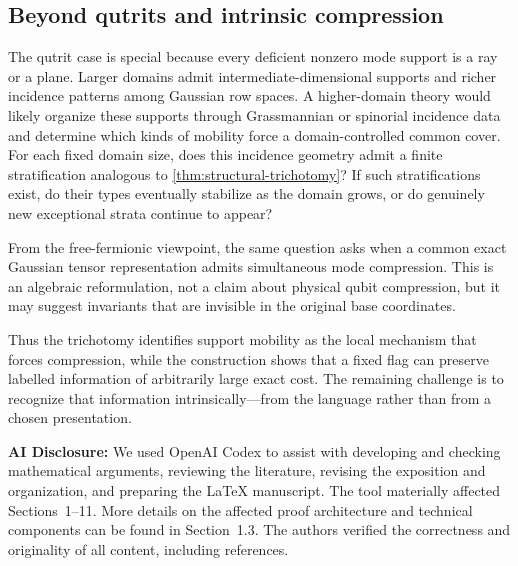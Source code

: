 \documentclass[11pt]{article}
\theoremstyle{definition}
\theoremstyle{remark}
\begin{document}
\subsection{Beyond qutrits and intrinsic compression}

The qutrit case is special because every deficient nonzero mode support is a
ray or a plane.  Larger domains admit intermediate-dimensional supports and
richer incidence patterns among Gaussian row spaces.  A higher-domain theory
would likely organize these supports through Grassmannian or spinorial
incidence data and determine which kinds of mobility force a
domain-controlled common cover.  For each fixed domain size, does this
incidence geometry admit a finite stratification analogous to
\cref{thm:structural-trichotomy}?  If such stratifications exist, do their
types eventually stabilize as the domain grows, or do genuinely new
exceptional strata continue to appear?

From the free-fermionic viewpoint, the same question asks when a common exact
Gaussian tensor representation admits simultaneous mode compression.  This
is an algebraic reformulation, not a claim about physical qubit compression,
but it may suggest invariants that are invisible in the original base
coordinates.

Thus the trichotomy identifies support mobility as the local mechanism that
forces compression, while the construction shows that a fixed flag can
preserve labelled information of arbitrarily large exact cost.  The remaining
challenge is to recognize that information intrinsically---from the language
rather than from a chosen presentation.

\noindent\textbf{AI Disclosure:}
We used OpenAI Codex to assist with developing and checking mathematical
arguments, reviewing the literature, revising the exposition and organization,
and preparing the \LaTeX{} manuscript.  The tool materially affected
Sections~1--11.  More details on the affected proof architecture and technical
components can be found in Section~1.3.  The authors verified the correctness
and originality of all content, including references.
\end{document}
